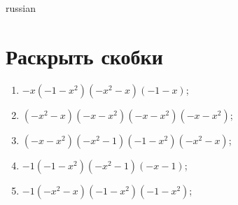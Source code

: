 \documentclass[20pt,a4paper]{article}
\begin{document}
\begin{otherlanguage*}{russian}

\section{Раскрыть скобки}
\begin{enumerate}
\item $-x(-1 - x^2)(-x^2 - x)(-1 - x)$;
\item $(-x^2 - x)(-x - x^2)(-x - x^2)(-x - x^2)$;
\item $(-x - x^2)(-x^2 - 1)(-1 - x^2)(-x^2 - x)$;
\item $-1(-1 - x^2)(-x^2 - 1)(-x - 1)$;
\item $-1(-x^2 - x)(-1 - x^2)(-1 - x^2)$;
\end{enumerate}
\end{otherlanguage*}
\end{document}
